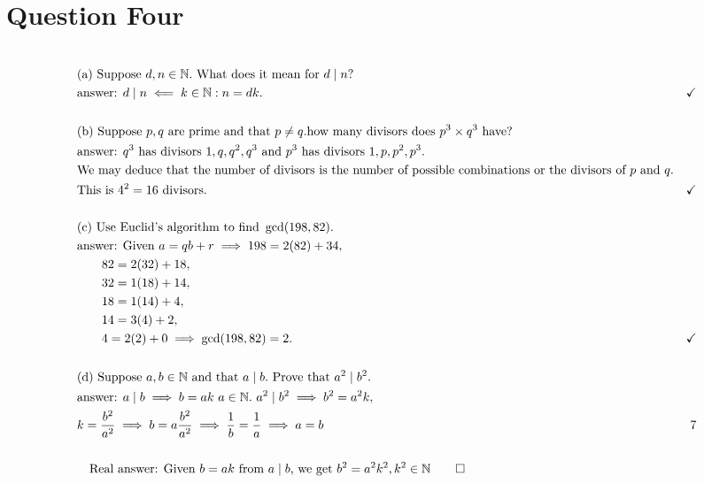 \documentclass{article}
\begin{document}
    \section{Question Four}
        \begin{align*}
            &\\
            &\text{(a) Suppose }d, n \in \N.\text{ What does it mean for }d \mid n?\\
            &\text{answer: }d\mid n \impliedby k\in\N: n = dk. & \checkmark\\
            &\\
            &\text{(b) Suppose }p, q\text{ are prime and that }p \neq q. \text{how many divisors does } p^3 \times q^3\text{ have?}\\
            &\text{answer: }q^3\text{ has divisors }1, q, q^2, q^3 \text{ and } p^3\text{ has divisors }1, p, p^2, p^3.\\
            &\text{We may deduce that the number of divisors is the number of possible combinations or the divisors of }p \text{ and }q.\\
            &\text{This is }4^2 = 16\text{ divisors.} & \checkmark\\
            &\\
            &\text{(c) Use Euclid's algorithm to find }\gcd(198, 82).\\
            &\text{answer: Given }a = qb + r \implies 198 = 2(82) + 34,\\
            &\qquad 82 = 2(32) + 18,\\
            &\qquad 32 = 1(18) + 14,\\
            &\qquad 18 = 1(14) + 4,\\
            &\qquad 14 = 3(4) + 2,\\
            &\qquad 4 = 2(2) + 0 \implies \gcd(198, 82) = 2. &\checkmark\\
            &\\
            &\text{(d) Suppose }a, b\in\N \text{ and that } a\mid b. \text{ Prove that }a^2\mid b^2.\\
            &\text{answer: }a\mid b\implies b = ak\ a\in\N.~a^2 \mid b^2 \implies b^2 = a^2k,\\
            &k = \frac{b^2}{a^2} \implies b = a\frac{b^2}{a^2} \implies \frac{1}{b} = \frac{1}{a} \implies a = b & \xmark\\
            &\\
            &\quad\text{Real answer: Given }b = ak \text{ from }a\mid b\text{, we get }b^2 = a^2k^2, k^2\inn\qquad\square\\

\end{align*}
\end{document}

